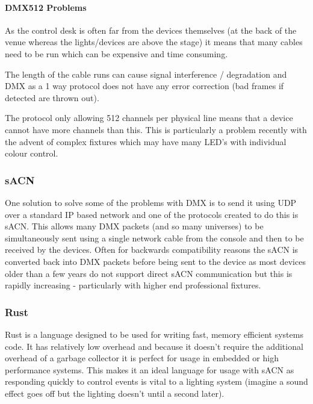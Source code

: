 \documentclass[12pt,a4paper,notitlepage]{report}
\begin{document}
\paragraph*{DMX512 Problems}
\begin{list}{}{}
	\item As the control desk is often far from the devices themselves (at the back of the venue whereas the lights/devices are above the stage) it means that many cables need to be run which can be expensive and time consuming.
	\item The length of the cable runs can cause signal interference / degradation and DMX as a 1 way protocol does not have any error correction (bad frames if detected are thrown out).
	\item The protocol only allowing 512 channels per physical line means that a device cannot have more channels than this. This is particularly a problem recently with the advent of complex fixtures which may have many LED's with individual colour control.
\end{list}

\subsubsection*{sACN}
One solution to solve some of the problems with DMX is to send it using UDP over a standard IP based network and one of the protocols created to do this is sACN. This allows many DMX packets (and so many universes) to be simultaneously sent using a single network cable from the console and then to be received by the devices. Often for backwards compatibility reasons the sACN is converted back into DMX packets before being sent to the device as most devices older than a few years do not support direct sACN communication but this is rapidly increasing - particularly with higher end professional fixtures. 

\subsubsection*{Rust}
Rust \cite{RUST_LANG} is a language designed to be used for writing fast, memory efficient systems code. It has relatively low overhead and because it doesn't require the additional overhead of a garbage collector it is perfect for usage in embedded or high performance systems. This makes it an ideal language for usage with sACN as responding quickly to control events is vital to a lighting system (imagine a sound effect goes off but the lighting doesn't until a second later). 
\end{document}
